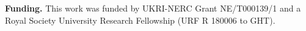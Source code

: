 \documentclass[12pt,letterpaper]{article}
\begin{document}

\textbf{Funding.}
This work was funded by UKRI-NERC Grant NE/T000139/1 and a Royal Society University Research Fellowship (URF R 180006 to GHT).




\end{document}
